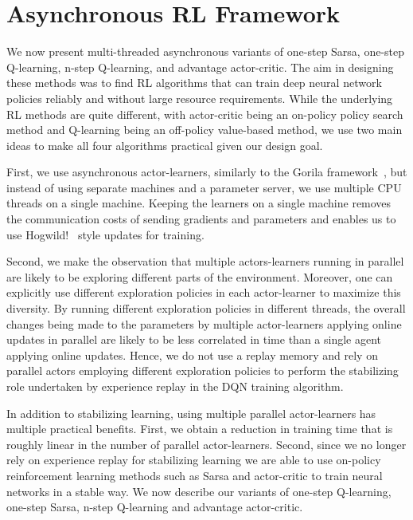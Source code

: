 \documentclass{article} %
\begin{document}
%

%
%
%
%
%
%
%
%
%
%
%
%

%
%


%
\vspace{-0.1cm}
\section{Asynchronous RL Framework}
\label{sec:method}

%
%
%
%

We now present multi-threaded asynchronous variants of one-step Sarsa, one-step Q-learning, n-step Q-learning, and advantage actor-critic.
The aim in designing these methods was to find RL algorithms that can train deep neural network policies reliably and without large resource requirements.
While the underlying RL methods are quite different, with actor-critic being an on-policy policy search method and Q-learning being an off-policy value-based method, we use two main ideas to make all four algorithms practical given our design goal.

%
First, we use asynchronous actor-learners, similarly to the Gorila framework~\citep{nair2015gorila}, but instead of using separate machines and a parameter server, we use multiple CPU threads on a single machine.
Keeping the learners on a single machine removes the communication costs of sending gradients and parameters and enables us to use Hogwild!~\citep{recht2011hogwild} style updates for training.

Second, we make the observation that multiple actors-learners running in parallel are likely to be exploring different parts of the environment.
Moreover, one can explicitly use different exploration policies in each actor-learner to maximize this diversity.
By running different exploration policies in different threads, the overall changes being made to the parameters by multiple actor-learners applying online updates in parallel are likely to be less correlated in time than a single agent applying online updates.
Hence, we do not use a replay memory and rely on parallel actors employing different exploration policies to perform the stabilizing role undertaken by experience replay in the DQN training algorithm.

In addition to stabilizing learning, using multiple parallel actor-learners has multiple practical benefits.
First, we obtain a reduction in training time that is roughly linear in the number of parallel actor-learners.
Second, since we no longer rely on experience replay for stabilizing learning we are able to use on-policy reinforcement learning methods such as Sarsa and actor-critic to train neural networks in a stable way.
%
We now describe our variants of one-step Q-learning, one-step Sarsa, n-step Q-learning and advantage actor-critic.
%
\end{document}
